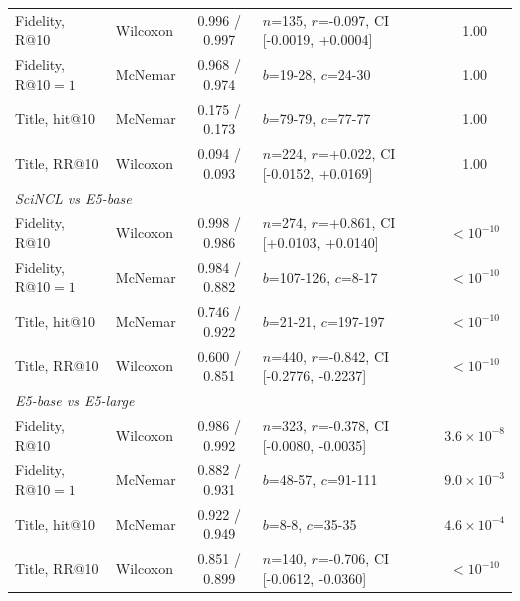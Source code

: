 \begin{table}[tbp]
\begin{tabular}{|l|l|c|l|c|}
Fidelity, R@10 & Wilcoxon & 0.996 / 0.997 & $n$=135, $r$=-0.097, CI [-0.0019, +0.0004] & 1.00 \\
Fidelity, R@10$=1$ & McNemar & 0.968 / 0.974 & $b$=19-28, $c$=24-30 & 1.00 \\
Title, hit@10 & McNemar & 0.175 / 0.173 & $b$=79-79, $c$=77-77 & 1.00 \\
Title, RR@10 & Wilcoxon & 0.094 / 0.093 & $n$=224, $r$=+0.022, CI [-0.0152, +0.0169] & 1.00 \\
\multicolumn{5}{|l|}{\textit{SciNCL vs E5-base}} \\
Fidelity, R@10 & Wilcoxon & 0.998 / 0.986 & $n$=274, $r$=+0.861, CI [+0.0103, +0.0140] & $<10^{-10}$ \\
Fidelity, R@10$=1$ & McNemar & 0.984 / 0.882 & $b$=107-126, $c$=8-17 & $<10^{-10}$ \\
Title, hit@10 & McNemar & 0.746 / 0.922 & $b$=21-21, $c$=197-197 & $<10^{-10}$ \\
Title, RR@10 & Wilcoxon & 0.600 / 0.851 & $n$=440, $r$=-0.842, CI [-0.2776, -0.2237] & $<10^{-10}$ \\
\multicolumn{5}{|l|}{\textit{E5-base vs E5-large}} \\
Fidelity, R@10 & Wilcoxon & 0.986 / 0.992 & $n$=323, $r$=-0.378, CI [-0.0080, -0.0035] & $3.6\times10^{-8}$ \\
Fidelity, R@10$=1$ & McNemar & 0.882 / 0.931 & $b$=48-57, $c$=91-111 & $9.0\times10^{-3}$ \\
Title, hit@10 & McNemar & 0.922 / 0.949 & $b$=8-8, $c$=35-35 & $4.6\times10^{-4}$ \\
Title, RR@10 & Wilcoxon & 0.851 / 0.899 & $n$=140, $r$=-0.706, CI [-0.0612, -0.0360] & $<10^{-10}$ \\
\hline
\end{tabular}
\end{table}